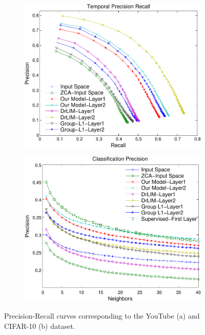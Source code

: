 \begin{figure} \centering \begin{subfigure}[b]{0.45\textwidth}
\includegraphics[width=\textwidth]{./figures/slow/Rebbutal_Figures/AUC_time-crop.pdf}
\caption{} \label{fig:ROCtime} \end{subfigure} \centering
\begin{subfigure}[b]{0.45\textwidth}
\includegraphics[width=\textwidth]{./figures/slow/Rebbutal_Figures/AUC_class-crop.pdf}
\caption{} \label{fig:ROCCIFAR} \end{subfigure} \caption{Precision-Recall
curves corresponding to the YouTube (a) and CIFAR-10 (b) dataset.}
\label{fig:ROC} \end{figure}

